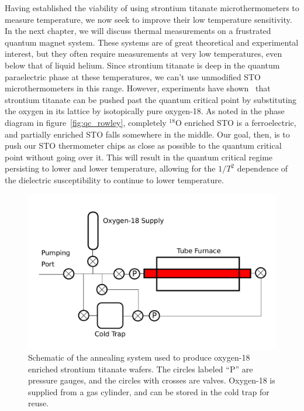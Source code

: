 \documentclass{thesis-umich}
\begin{document}
Having established the viability of using strontium titanate microthermometers to measure temperature, we now seek to improve their low temperature sensitivity. In the next chapter, we will discuss thermal measurements on a frustrated quantum magnet system. These systems are of great theoretical and experimental interest, but they often require measurements at very low temperatures, even below that of liquid helium. Since strontium titanate is deep in the quantum paraelectric phase at these temperatures, we can't use unmodified STO microthermometers in this range. However, experiments have shown~\cite{Rowley2014} that strontium titanate can be pushed past the quantum critical point by substituting the oxygen in its lattice by isotopically pure oxygen-18. As noted in the phase diagram in figure~\ref{fig:qc_rowley}, completely $^{18}$O enriched STO is a ferroelectric, and partially enriched STO falls somewhere in the middle. Our goal, then, is to push our STO thermometer chips as close as possible to the quantum critical point without going over it. This will result in the quantum critical regime persisting to lower and lower temperature, allowing for the $1/T^2$ dependence of the dielectric susceptibility to continue to lower temperature.  

\begin{figure} \caption[Strontium Titanate Annealing System]{Schematic of the annealing system used to produce oxygen-18 enriched strontium titanate wafers. The circles labeled ``P'' are pressure gauges, and the circles with crosses are valves. Oxygen-18 is supplied from a gas cylinder, and can be stored in the cold trap for reuse.}
	\label{fig:annealing_sys}
\includegraphics[width=\columnwidth]{figures/annealing_system.pdf}
\end{figure}
\end{document}
